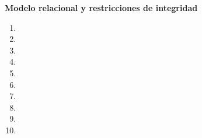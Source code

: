 \documentclass{report}
\begin{document}
    \begin{center}
        \LARGE{\textbf{Modelo relacional y restricciones de integridad}}\vspace{.3cm}
    \end{center}
    \normalsize
    
    \begin{enumerate}[label=\alph*.]
        \item 
        \item 
        \item 
        \item 
        \item 
        \item 
        \item 
        \item 
        \item 
        \item 
    \end{enumerate}

    \newpage
  
\end{document}
